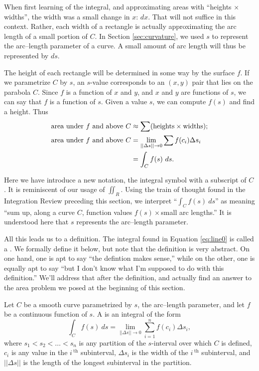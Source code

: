 When first learning of the integral, and approximating areas with ``heights $\times$ widths'', the width was a small change in $x$: $dx$. That will not suffice in this context. Rather, each width of a rectangle is actually approximating the arc length of a small portion of $C$. In Section \ref{sec:curvature}, we used $s$ to represent the arc--length parameter of a curve. A small amount of arc length will thus be represented by $ds$. 

The height of each rectangle will be determined in some way by the surface $f$. If we parametrize $C$ by $s$, an $s$-value corresponds to an $(x,y)$ pair that lies on the parabola $C$. Since $f$ is a function of $x$ and $y$, and $x$ and $y$ are functions of $s$, we can say that $f$ is a function of $s$. Given a value $s$, we can compute $f(s)$ and find a height. Thus
\begin{align}
\text{area under $f$ and above $C$}&\approx \sum (\text{heights}\times\text{widths});\notag\\
		\text{area under $f$ and above $C$}							&=\lim_{||\Delta s||\to0}\sum f(c_i)\Delta s_i\notag\\
									&=\int_Cf(s)\ ds.\label{eq:line0}
\end{align}

Here we have introduce a new notation, the integral symbol with a subscript of $C$. It is reminiscent of our usage of $\iint_R$. Using the train of thought found in the Integration Review preceding this section, we interpret ``$\int_C f(s)\ ds$'' as meaning ``sum up, along a curve $C$, function values $f(s)\times$small arc lengths.'' It is understood here that $s$ represents the arc--length parameter.

All this leads us to a definition. The integral found in Equation \ref{eq:line0} is called a . We formally define it below, but note that the definition is very abstract. On one hand, one is apt to say ``the defintion makes sense,'' while on the other, one is equally apt to say ``but I don't know what I'm supposed to do with this definition.'' We'll address that after the definition, and actually find an answer to the area problem we posed at the beginning of this section.

{Let $C$ be a smooth curve parametrized by $s$, the arc--length parameter, and let $f$ be a continuous function of $s$. A  is an integral of the form
$$\int_C f(s)\ ds = \lim_{||\Delta s||\to 0}\sum_{i=1}^n f(c_i)\Delta s_i,$$
where $s_1<s_2<\ldots<s_n$ is any partition of the $s$-interval over which $C$ is defined, $c_i$ is any value in the $i\,^\text{th}$ subinterval,  $\Delta s_i$ is the width of the $i\,^\text{th}$ subinterval, and $||\Delta s||$ is the length of the longest subinterval in the partition.%
}




